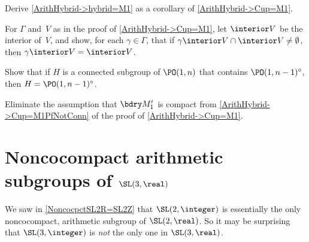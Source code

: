 \begin{exercises}
\item \label{HybridMfromM'}
 Derive \cref{ArithHybrid->hybrid=M1} as a corollary of
\cref{ArithHybrid->Cup=M1}.

\item \label{VTessellation}
 For $\Gamma$ and~$V$ as in the proof of
\cref{ArithHybrid->Cup=M1}, let $\interior V$ be the
interior of~$V$, and show, for each $\gamma \in \Gamma$,
that if $\gamma \interior V \cap \interior V \neq \emptyset$,
then $\gamma \interior V = \interior V$.

\item \label{MaxlInPO1n}
 Show that if $H$ is a connected subgroup of $\PO(1,n)$
that contains $\PO(1,n-1)^\circ$, then $H =
\PO(1,n-1)^\circ$.

\item \label{HybridWithNoncpctBdry}
 Eliminate the assumption that $\bdry M_1'$ is compact from
\cref{ArithHybrid->Cup=M1PfNotConn} of the proof of
\cref{ArithHybrid->Cup=M1}.

\end{exercises}





\section{Noncocompact arithmetic subgroups of \texorpdfstring{$\SL(3,\real)$}{SL(3,R)}}
\label{NonLattinSL3Sect}

We saw in \cref{NoncocpctSL2R=SL2Z} that
$\SL(2,\integer)$ is essentially the only noncocompact,
arithmetic subgroup of $\SL(2,\real)$. So it may be
surprising that $\SL(3,\integer)$ is \emph{not} the only
one in $\SL(3,\real)$.

